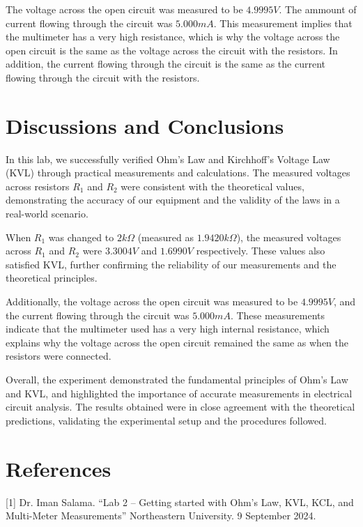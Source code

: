 \documentclass{article}
\begin{document}
The voltage across the open circuit was measured to be $4.9995V$. The ammount of current 
flowing through the circuit was $5.000mA$. This measurement implies that the multimeter has 
a very high resistance, which is why the voltage across the open circuit is the same as the
voltage across the circuit with the resistors. In addition, the current flowing through the
circuit is the same as the current flowing through the circuit with the resistors.

\section{Discussions and Conclusions}

In this lab, we successfully verified Ohm's Law and 
Kirchhoff's Voltage Law (KVL) through practical measurements 
and calculations. The measured voltages across resistors $R_1$ 
and $R_2$ were consistent with the theoretical values, demonstrating 
the accuracy of our equipment and the validity of the laws in a 
real-world scenario.
\newline

When $R_1$ was changed to $2k\Omega$ (measured as $1.9420 k\Omega$), 
the measured voltages across $R_1$ and $R_2$ were $3.3004V$ 
and $1.6990V$ respectively. These values also satisfied KVL, 
further confirming the reliability of our measurements and the 
theoretical principles.
\newline

Additionally, the voltage across the open circuit was measured 
to be $4.9995V$, and the current flowing through the circuit was 
$5.000mA$. These measurements indicate that the multimeter used has a 
very high internal resistance, which explains why the voltage across 
the open circuit remained the same as when the resistors were connected.
\newline

Overall, the experiment demonstrated the fundamental principles 
of Ohm's Law and KVL, and highlighted the importance of accurate 
measurements in electrical circuit analysis. The results obtained 
were in close agreement with the theoretical predictions, validating 
the experimental setup and the procedures followed.

\section{References}
 [1] Dr. Iman Salama. “Lab 2 – Getting started with Ohm’s Law, KVL, KCL,
and Multi-Meter Measurements” Northeastern University. 9 September 2024.
\end{document}
